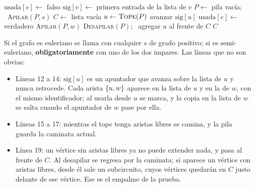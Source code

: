 \documentclass[11pt,letterpaper]{article}
\begin{document}
\begin{algorithm}[H]
\caption{\textsc{Hierholzer}$(G, s)$}
\label{alg:hierholzer}
\begin{algorithmic}[1]
    \State $\text{usada}[e] \gets$ falso
  \EndFor
    \State $\text{sig}[v] \gets$ primera entrada de la lista de $v$
  \EndFor
  \State $P \gets$ pila vacía; \ \textsc{Apilar}$(P, s)$
  \State $C \gets$ lista vacía
    \State $u \gets \textsc{Tope}(P)$
      \State avanzar $\text{sig}[u]$
    \EndWhile
      \State $\text{usada}[e] \gets$ verdadero
      \State \textsc{Apilar}$(P, w)$ 
    \Else {}
      \State \textsc{Desapilar}$(P)$; \ agregar $u$ al frente de $C$
    \EndIf
  \EndWhile
  \State \Return $C$
\EndProcedure
\end{algorithmic}
\end{algorithm}

Si el grafo es euleriano se llama con cualquier $s$ de grado positivo;
si es semi-euleriano, \textbf{obligatoriamente} con uno de los dos
impares. Las líneas que no son obvias:
\begin{itemize}[itemsep=0.1em]
  \item Líneas 12 a 14: $\text{sig}[u]$ es un apuntador que avanza
        sobre la lista de $u$ y nunca retrocede. Cada arista
        $\left\{ u, w \right\}$ aparece en la lista de $u$ y en la de $w$, con el
        mismo identificador; al usarla desde $u$ se marca, y la copia
        en la lista de $w$ se salta cuando el apuntador de $w$ pase por
        ella.
  \item Líneas 15 a 17: mientras el tope tenga aristas libres se
        camina, y la pila guarda la caminata actual.
  \item Línea 19: un vértice sin aristas libres ya no puede extender
        nada, y pasa al frente de $C$. Al desapilar se regresa por la
        caminata; si aparece un vértice con aristas libres, desde él
        sale un subcircuito, cuyos vértices quedarán en $C$ justo
        delante de ese vértice. Ese es el empalme de la prueba.
\end{itemize}
\end{document}
